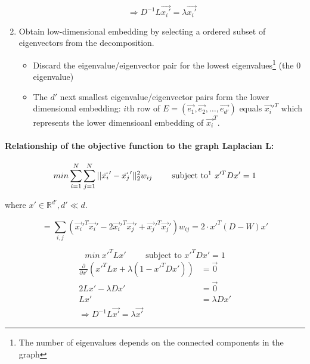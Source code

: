 \begin{enumerate}
      \[\Rightarrow \boxed{D^{-1} L \vec{x_i'} = \lambda \vec{x_i'}}\]

    \item Obtain low-dimensional embedding by selecting a ordered subset of eigenvectors from the decomposition.
    \begin{itemize}
        \item Discard the eigenvalue/eigenvector pair for the lowest eigenvalues\footnote{The number of eigenvalues depends on the connected components in the graph} (the 0 eigenvalue)
        \item The \(d'\) next smallest eigenvalue/eigenvector pairs form the lower dimensional embedding: \(i\)th row of \(E = (\vec{e_1}, \vec{e_2}, \dots, \vec{e_{d'}})\) equals  \(\vec{x_i}'^T\) which represents the lower dimensioanl embedding of \(\vec{x_i}^T\).
    \end{itemize}
\end{enumerate}

\paragraph{Relationship of the objective function to the graph Laplacian L:}
\[min \sum_{i=1}^{N}\sum_{j=1}^{N}||\vec{x_i}'- \vec{x_j}'||_2^2 w_{ij} \qquad \text{ subject to\footnote{squared distances should add up to 1} } x'^T D x' = 1 \]

where $ x'\in \mathbb{R}^{d'}, d' \ll d$.

\begin{equation*}
    = \sum_{i,j} (\vec{x_i}'^T \vec{x_i}' - 2 \vec{x_i}'^T \vec{x_j}' + \vec{x_j}'^T \vec{x_j}') w_{ij} = 2 \cdot x'^T (D-W) x'
\end{equation*}

\[min \ x'^T L x' \qquad \text{ subject to } x'^T D x' = 1\]
\begin{align*}
    \frac{\partial}{\partial x'} (x'^T L x + \lambda (1-x'^T D x')) &= \vec{0}\\
     2 L x' - \lambda D x' &= \vec{0}\\
    Lx' &= \lambda D x'\\
    \Rightarrow \boxed{D^{-1} L \vec{x'} = \lambda \vec{x'}}
\end{align*}
